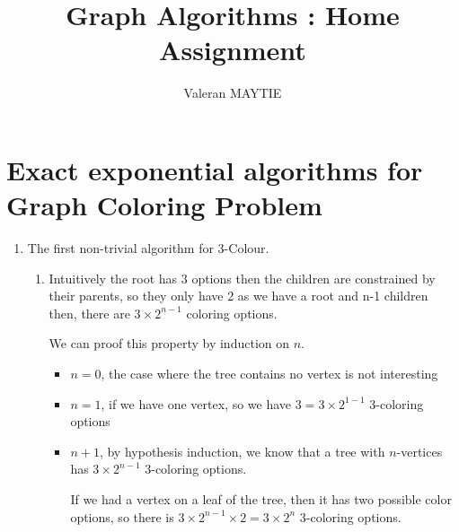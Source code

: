 \documentclass{article}
\title{Graph Algorithms : Home Assignment}
\author{Valeran MAYTIE}
\date{}
\theoremstyle{plain}
\begin{document}
  \maketitle

  \section*{Exact exponential algorithms for Graph Coloring Problem}

  \begin{enumerate}
    \item The first non-trivial algorithm for 3-Colour.
      \begin{enumerate}
        \item
          Intuitively the root has 3 options then the children are constrained by
          their parents, so they only have 2 as we have a root and n-1 children
          then, there are $3 \times 2^{n-1}$ coloring options.

          We can proof this property by induction on $n$.
          \begin{itemize}
            \item $n=0$, the case where the tree contains no vertex is not
              interesting

            \item $n=1$, if we have one vertex, so we have $3=3\times2^{1-1}$
              3-coloring options

            \item $n+1$, by hypothesis induction, we know that a tree with
              $n$-vertices has $3\times2^{n-1}$ 3-coloring options.

              If we had a vertex on a leaf of the tree, then it has two possible
              color options, so there is $3\times2^{n-1}\times 2 = 3 \times 2^n$
              3-coloring options.
          \end{itemize}



\end{enumerate}
\end{enumerate}
\end{document}
